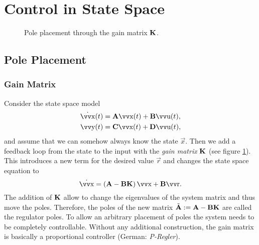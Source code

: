 
\section{Control in State Space}

\begin{figure}
	\centering
	\resizebox{\linewidth}{!}{%
	}
	\caption{
		Pole placement through the gain matrix \(\bm{\mathrm{K}}\).
		\label{fig:ss-pole-placement}
	}
\end{figure}

\subsection{Pole Placement}

\subsubsection{Gain Matrix}

Consider the state space model
\begin{align*}
	\dot{\vec{x}}(t) & = \mx{A} \vec{x}(t) + \mx{B} \vec{u}(t), \\
	\vec{y}(t)       & = \mx{C} \vec{x}(t) + \mx{D} \vec{u}(t),
\end{align*}
and assume that we can somehow always know the state \(\vec{x}\). Then we add a feedback loop from the state to the input with the \emph{gain matrix} \(\bm{\mathrm{K}}\) (see figure \ref{fig:ss-pole-placement}). This introduces a new term for the desired value \(\vec{r}\) and changes the state space equation to
\[
	\dot{\vec{x}} = \left(\mx{A} - \mx{B}\mx{K}\right) \vec{x} + \mx{B}\vec{r}.
\]
The addition of \(\bm{\mathrm{K}}\) allow to change the eigenvalues of the system matrix and thus move the poles. Therefore, the poles of the new matrix \(\tilde{\bm{\mathrm{A}}} := \bm{\mathrm{A}} - \bm{\mathrm{B}}\bm{\mathrm{K}}\) are called the regulator poles. To allow an arbitrary placement of poles the system needs to be completely controllable. Without any additional construction, the gain matrix is basically a proportional controller (German: \textsl{P-Regler}).


